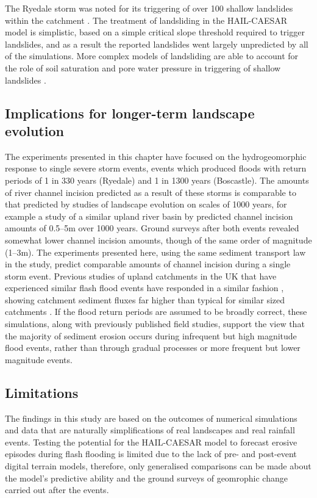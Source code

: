 The Ryedale storm was noted for its triggering of over 100 shallow landslides within the catchment \citep{galiatsatos2007assessment,dong2006evaluation,
wass2008investigation}. The treatment of landsliding in the HAIL-CAESAR model is simplistic, based on a simple critical slope threshold required to trigger landslides, and as a result the reported landslides went largely unpredicted by all of the simulations. More complex models of landsliding are able to account for the role of soil saturation and pore water pressure in triggering of shallow landslides \citep[e.g.][]{iverson2000landslide,crosta2003distributed}. 

\subsection{Implications for longer-term landscape evolution}
The experiments presented in this chapter have focused on the hydrogeomorphic response to single severe storm events, events which produced floods with return periods of 1 in 330 years (Ryedale) and 1 in 1300 years (Boscastle). The amounts of river channel incision predicted as a result of these storms is comparable to that predicted by studies of landscape evolution on scales of 1000 years, for example a study of a similar upland river basin by \citep{coulthard2016sensitivity} predicted channel incision amounts of 0.5--5m over 1000 years. Ground surveys after both events \citep{wallingford2005flooding,dong2006evaluation} revealed somewhat lower channel incision amounts, though of the same order of magnitude (1--3m). The experiments presented here, using the same sediment transport law in the \citet{coulthard2016sensitivity} study, predict comparable amounts of channel incision during a single storm event. Previous studies of upland catchments in the UK that have experienced similar flash flood events have responded in a similar fashion \citep{johnson2002flooding,milan2012geomorphic}, showing catchment sediment fluxes far higher than typical for similar sized catchments \citep[e.g.][]{johnson2002annual}. If the flood return periods are assumed to be broadly correct, these simulations, along with previously published field studies, support the view that the majority of sediment erosion occurs during infrequent but high magnitude flood events, rather than through gradual processes or more frequent but lower magnitude events.

               
\subsection{Limitations}
The findings in this study are based on the outcomes of numerical simulations and data that are naturally simplifications of real landscapes and real rainfall events. Testing the potential for the HAIL-CAESAR model to forecast erosive episodes during flash flooding is limited due to the lack of pre- and post-event digital terrain models, therefore, only generalised comparisons can be made about the model's predictive ability and the ground surveys of geomrophic change carried out after the events. 

